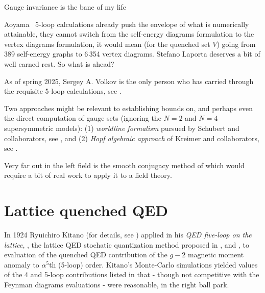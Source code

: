 \begin{bartlett}{
{Gauge invariance is the bane of my life}
        }
\end{bartlett}
\bigskip

\noindent
Aoyama \etal\ 5-loop calculations already push the envelope of what is
numerically attainable, they cannot switch from the self-energy
diagrams formulation to the vertex diagrams formulation, it would mean
(for the quenched set $V$) going from 389 self-energy graphs to 6\,354
vertex diagrams. Stefano Laporta deserves a bit of well earned rest. So
what is ahead?

As of spring 2025, 
Sergey  A. Volkov is the
only person who has carried through the requisite 5-loop calculations,
see .

Two approaches might be relevant to
establishing bounds on, and perhaps even the direct computation
of gauge sets (ignoring the $N\!=\!2$ and $N\!=\!4$
supersymmetric models):
(1)
\emph{worldline formalism} pursued by
{Schubert} and collaborators,
see ,
and
(2)
\emph{Hopf algebraic approach} of Kreimer and collaborators,
see .

Very far out in the left field is the smooth conjugacy method of
 which would require a bit of real work to apply it
to a field theory.



\section{Lattice quenched QED}
\label{sect:latticeQED}

In 1924 Ryuichiro Kitano (for details, see )
applied in his
{\em QED five-loop on the lattice},
,
the lattice QED stochatic quantization method 
proposed in 
,  and  ,
to evaluation of the quenched QED contribution of the {$g-2$} magnetic moment anomaly
to $\alpha^5$th (5-loop) order.
Kitano's Monte-Carlo simulations yielded values of the 4 and 5-loop contributions 
listed in 
that - though not competitive with the Feynman diagrams evaluations - were
reasonable, in the right ball park.

